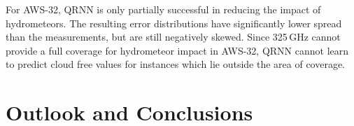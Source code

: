\documentclass[amt, manuscript]{copernicus}
\begin{document}
For AWS-32, QRNN is only partially successful in reducing the impact of hydrometeors. The resulting error distributions have significantly lower spread than the measurements, but are still negatively skewed. Since 325\,GHz cannot provide a full coverage for hydrometeor impact in AWS-32, QRNN cannot learn to predict cloud free values for instances which lie outside the area of coverage. 

\section{Outlook and Conclusions}  %













\appendix
\section{}    %

\subsection{}     %


\noappendix       %


\end{document}
